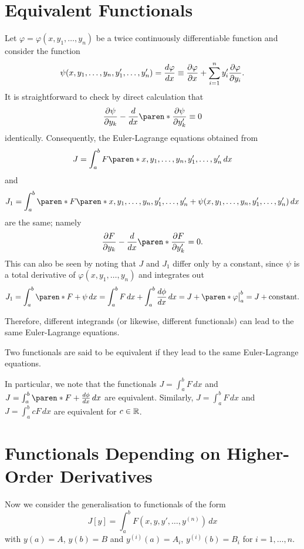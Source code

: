 \documentclass[11pt]{penrose}
\begin{document}
\section{Equivalent Functionals}
Let $\varphi = \varphi(x, y_1, \dots, y_n)$ be a twice continuously differentiable function and consider the function
\begin{equation}
    \psi(x, y_1, \dots, y_n, y'_1, \dots, y'_n)
    = \frac{d\varphi}{dx}
    \equiv \frac{\partial \varphi}{\partial x} + \sum_{i=1}^{n} y'_i \frac{\partial \varphi}{\partial y_i}.
\end{equation}
It is straightforward to check by direct calculation that
\begin{equation}
    \frac{\pd \psi}{\pd y_k} - \frac{d}{dx} \paren*{\frac{\pd \psi}{\pd y'_k}} \equiv 0
\end{equation}
identically. Consequently, the Euler-Lagrange equations obtained from
\begin{equation}
    J = \int_a^b F\paren*{x, y_1, \dots, y_n, y'_1, \dots, y'_n} \,dx
\end{equation}
and
\begin{equation}
    J_1 = \int_a^b \paren*{F\paren*{x, y_1, \dots, y_n, y'_1, \dots, y'_n} + \psi(x, y_1, \dots, y_n, y'_1, \dots, y'_n)} \,dx
\end{equation}
are the same; namely
\begin{equation}
    \frac{\pd F}{\pd y_k} - \frac{d}{dx} \paren*{\frac{\pd F}{\pd y'_k}} = 0.
\end{equation}
This can also be seen by noting that $J$ and $J_1$ differ only by a constant, since $\psi$ is a total derivative of $\varphi(x, y_1, \dots, y_n)$ and integrates out
\begin{equation}
    J_1 = \int_a^b \paren*{F + \psi} \,dx
    = \int_a^b F \,dx + \int_a^b \frac{d\phi}{dx} \,dx
    = J + \paren*{\big. \varphi \big|_a^b}
    = J + \text{constant}.
\end{equation}

Therefore, different integrands (or likewise, different functionals) can lead to the same Euler-Lagrange equations.

Two functionals are said to be equivalent if they lead to the same Euler-Lagrange equations.

In particular, we note that the functionals $J = \int_a^b F \,dx$ and $J = \int_a^b \paren*{F + \frac{d\phi}{dx}} \,dx$ are equivalent. Similarly, $J = \int_a^b F \,dx$ and $J = \int_a^b cF \,dx$ are equivalent for $c \in \mathbb{R}$.

\section{Functionals Depending on Higher-Order Derivatives}
Now we consider the generalisation to functionals of the form
\begin{equation}
    J[y] = \int_a^b F(x, y, y', \dots, y^{(n)}) \,dx
\end{equation}
with $y(a) = A$, $y(b) = B$ and $y^{(i)}(a) = A_i$, $y^{(i)}(b) = B_i$ for $i=1, \dots, n$.
\end{document}
